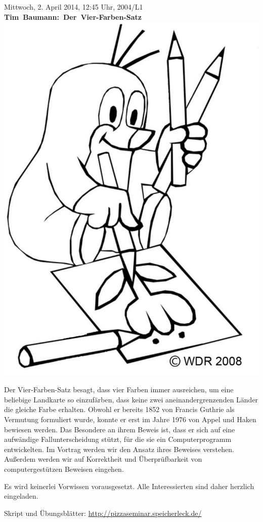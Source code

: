 \documentclass[a4paper,ngerman,landscape]{scrartcl}
\begin{document}
\begin{center}
  \huge
  Mittwoch, 2. April 2014, 12:45 Uhr, 2004/L1 \\
  \mbox{\textbf{Tim Baumann: Der Vier-Farben-Satz}}
  \vfill
  \vspace{0.3em}
  \includegraphics[scale=0.55]{vier-farben-satz}
  \vfill

  \Large
  \begin{minipage}{0.85\textwidth}
    \setlength\parskip{\medskipamount}
    \vspace{0.3em}
    Der Vier-Farben-Satz besagt, dass vier Farben immer ausreichen, um eine
    beliebige Landkarte so einzufärben, dass keine zwei aneinandergrenzenden
    Länder die gleiche Farbe erhalten. Obwohl er bereits 1852 von Francis
    Guthrie als Vermutung formuliert wurde, konnte er erst im Jahre 1976 von
    Appel und Haken bewiesen werden. Das Besondere an ihrem Beweis ist, dass er
    sich auf eine aufwändige Fallunterscheidung stützt, für die sie ein
    Computerprogramm entwickelten. Im Vortrag werden wir den Ansatz ihres
    Beweises verstehen. Außerdem werden wir auf Korrektheit und
    Überprüfbarkeit von computergestützen Beweisen eingehen.

    Es wird keinerlei Vorwissen vorausgesetzt. Alle Interessierten sind
    daher herzlich eingeladen.

    \vspace{1em}
    \hfill\small Skript und Übungsblätter: \url{http://pizzaseminar.speicherleck.de/}
  \end{minipage}
\end{center}
\end{document}
